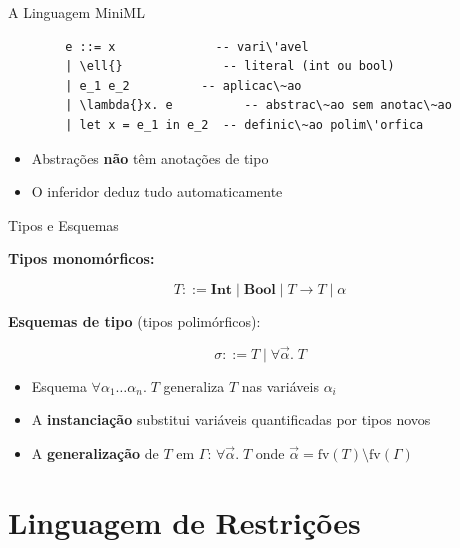 \begin{frame}[fragile]{A Linguagem MiniML}

    \begin{lstlisting}
        e ::= x              -- vari\'avel
        | \ell{}              -- literal (int ou bool)
        | e_1 e_2          -- aplicac\~ao
        | \lambda{}x. e          -- abstrac\~ao sem anotac\~ao
        | let x = e_1 in e_2  -- definic\~ao polim\'orfica
    \end{lstlisting}

    \begin{itemize}

        \item
        Abstrações \textbf{não} têm anotações de tipo
        \item
        O inferidor deduz tudo automaticamente
    \end{itemize}
\end{frame}

\begin{frame}{Tipos e Esquemas}

    \textbf{Tipos monomórficos:}

    \[T ::= \mathbf{Int} \mid \mathbf{Bool} \mid T \to T \mid \alpha\]

    \textbf{Esquemas de tipo} (tipos polimórficos):

    \[\sigma ::= T \mid \forall \vec{\alpha}.\; T\]

    \begin{itemize}

        \item
        Esquema \(\forall \alpha_1 \ldots \alpha_n.\; T\) generaliza \(T\) nas
        variáveis \(\alpha_i\)
        \item
        A \textbf{instanciação} substitui variáveis quantificadas por tipos
        novos
        \item
        A \textbf{generalização} de \(T\) em \(\Gamma\):
        \(\forall \vec{\alpha}.\; T\) onde
        \(\vec{\alpha} = \mathrm{fv}(T) \setminus \mathrm{fv}(\Gamma)\)
    \end{itemize}
\end{frame}


\section{Linguagem de Restrições}\label{linguagem-de-restriuxe7uxf5es}

